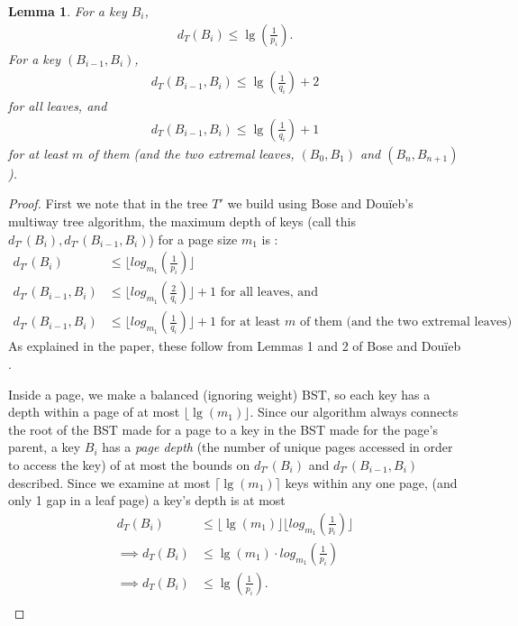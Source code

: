 \documentclass[letterpaper,12pt,titlepage,oneside,final]{book}
\theoremstyle{plain}
\newtheorem{lem}[thm]{Lemma}
\begin{document}
\begin{lem} \label{451}
For a key $B_i$,
\begin{align*} 
d_T(B_i) \leq \lg(\frac{1}{p_i}).
\end{align*}
For a key $(B_{i-1},B_i)$,
\begin{align*} 
d_T(B_{i-1},B_i) \leq \lg(\frac{1}{q_i}) + 2
\end{align*}
for all leaves, and
\begin{align*} 
d_T(B_{i-1},B_i) \leq \lg(\frac{1}{q_i}) + 1
\end{align*}
for at least $m$ of them (and the two extremal leaves, $(B_0, B_1)$ and $(B_n, B_{n+1})$). 
  
\end{lem}

\begin{proof}
First we note that in the tree $T'$ we build using Bose and Dou\"{i}eb's multiway tree algorithm, the maximum depth of keys (call this $d_{T'}(B_i), d_{T'}(B_{i-1},B_i)$) for a page size $m_1$ is \cite{bose2009efficient}:
\begin{align*} d_{T'}(B_i) &\leq \lfloor log_{m_1}(\frac{1}{p_i}) \rfloor \\
d_{T'}(B_{i-1},B_i) &\leq \lfloor log_{m_1}(\frac{2}{q_i}) \rfloor + 1 \text{ for all leaves, and}\\
d_{T'}(B_{i-1},B_i) &\leq \lfloor log_{m_1}(\frac{1}{q_i}) \rfloor + 1 \text{ for at least $m$ of them (and the two extremal leaves)}
 \end{align*}
As explained in the paper, these follow from Lemmas 1 and 2 of Bose and Dou\"{i}eb \cite{bose2009efficient}.

Inside a page, we make a balanced (ignoring weight) BST, so each key has a depth within a page of at most $\lfloor \lg(m_1) \rfloor$. Since our algorithm always connects the root of the BST made for a page to a key in the BST made for the page's parent, a key $B_i$ has a \textit{page depth} (the number of unique pages accessed in order to access the key) of at most the bounds on $d_{T'}(B_i)$ and $d_{T'}(B_{i-1},B_i)$ described. Since we examine at most $\lceil \lg(m_1) \rceil$ keys within any one page, (and only 1 gap in a leaf page) a key's depth is at most
\begin{align*}
d_T(B_i) &\leq \lfloor \lg(m_1) \rfloor \lfloor log_{m_1}(\frac{1}{p_i}) \rfloor \\
\implies d_T(B_i) &\leq \lg(m_1)\cdot log_{m_1}(\frac{1}{p_i}) \\
\implies d_T(B_i) &\leq \lg(\frac{1}{p_i}). \\
\end{align*}


\end{proof}
\end{document}
